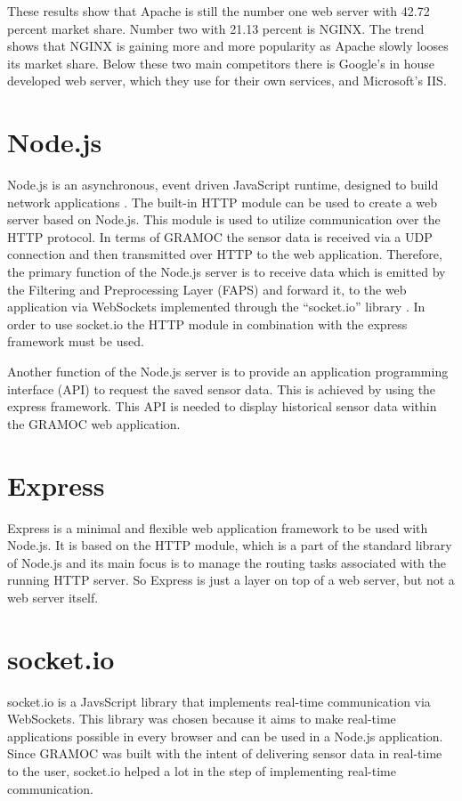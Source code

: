 These results show that Apache is still the number one web server with 42.72 percent market share. Number two with 21.13 percent is NGINX. The trend shows that NGINX is gaining more and more popularity as Apache slowly looses its market share. Below these two main competitors there is Google's in house developed web server, which they use for their own services, and Microsoft's IIS.

\section{Node.js}
\label{sec:nodejs}
Node.js is an asynchronous, event driven JavaScript runtime, designed to build network applications \autocite{Node}. The built-in HTTP module can be used to create a web server based on Node.js. This module is used to utilize communication over the HTTP protocol. In terms of GRAMOC the sensor data is received via a UDP connection and then transmitted over HTTP to the web application. Therefore, the primary function of the Node.js server is to receive data which is emitted by the Filtering and Preprocessing Layer (FAPS) and forward it, to the web application via WebSockets implemented through the ``socket.io'' library \autocite{socketio}. In order to use socket.io the HTTP module in combination with the express framework must be used.

Another function of the Node.js server is to provide an application programming interface (API) to request the saved sensor data. This is achieved by using the express framework. This API is needed to display historical sensor data within the GRAMOC web application.

\section{Express}
Express is a minimal and flexible web application framework to be used with Node.js. It is based on the HTTP module, which is a part of the standard library of Node.js and its main focus is to manage the routing tasks associated with the running HTTP server. So Express is just a layer on top of a web server, but not a web server itself.

\section{socket.io}
\label{sec:socketio}
socket.io is a JavsScript library that implements real-time communication via WebSockets. This library was chosen because it aims to make real-time applications possible in every browser and can be used in a Node.js application. Since GRAMOC was built with the intent of delivering sensor data in real-time to the user, socket.io helped a lot in the step of implementing real-time communication.

